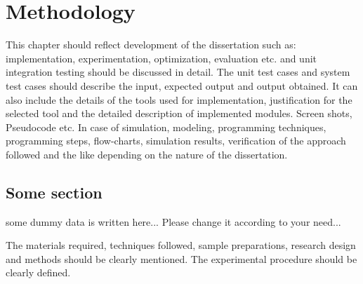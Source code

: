 \chapter{Methodology}
This chapter should reflect development of the dissertation such as: implementation, experimentation, optimization, evaluation etc. and unit integration testing should be discussed in detail.  The unit test cases and system test cases should describe the input, expected output and output obtained. It can also include the details of the tools used for implementation, justification for the selected tool and the detailed description of implemented modules.  Screen shots, Pseudocode etc. 
In case of simulation, modeling, programming techniques, programming steps, flow-charts, simulation results, verification of the approach followed and the like depending on the nature of the dissertation. 
\section{Some section}
some dummy data is written here... Please change it according to your need...

The materials required, techniques followed, sample preparations, research design and methods should be clearly mentioned. The experimental procedure should be clearly defined.